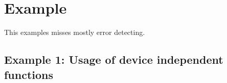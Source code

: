 \documentclass[a4paper,oneside]{article}
\begin{document}
%
%
%
%
%
%
%

\section{Example}

This examples misses mostly error detecting.

\subsection{Example 1: Usage of device independent functions}
\end{document}
